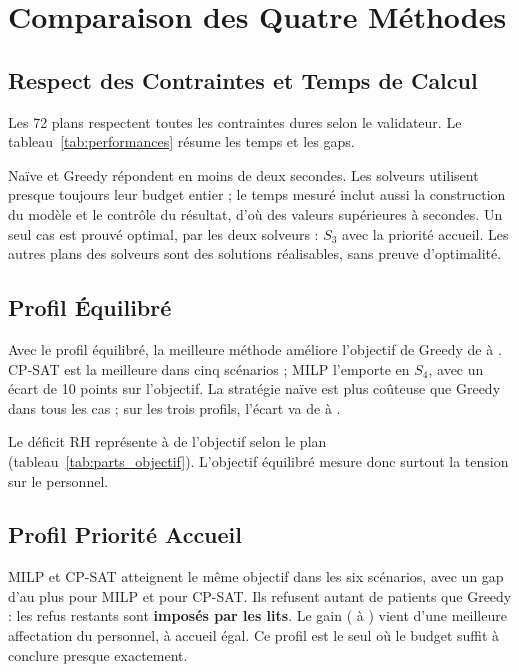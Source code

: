 \section{Comparaison des Quatre Méthodes}

\subsection{Respect des Contraintes et Temps de Calcul}
Les 72 plans respectent toutes les contraintes dures selon le validateur. Le tableau~\ref{tab:performances} résume les temps et les gaps.



Naïve et Greedy répondent en moins de deux secondes. Les solveurs utilisent presque toujours leur budget entier ; le temps mesuré inclut aussi la construction du modèle et le contrôle du résultat, d'où des valeurs supérieures à \TempsSolveur{} secondes. Un seul cas est prouvé optimal, par les deux solveurs : $S_3$ avec la priorité accueil. Les autres plans des solveurs sont des solutions réalisables, sans preuve d'optimalité.

\subsection{Profil Équilibré}


Avec le profil équilibré, la meilleure méthode améliore l'objectif de Greedy de \GainMinEq{} à \GainMaxEq{}. CP-SAT est la meilleure dans cinq scénarios ; MILP l'emporte en $S_4$, avec un écart de 10 points sur l'objectif. La stratégie naïve est plus coûteuse que Greedy dans tous les cas ; sur les trois profils, l'écart va de \NaiveMin{} à \NaiveMax{}.

Le déficit RH représente \PartRhMin{} à \PartRhMax{} de l'objectif selon le plan (tableau~\ref{tab:parts_objectif}). L'objectif équilibré mesure donc surtout la tension sur le personnel.



\subsection{Profil Priorité Accueil}


MILP et CP-SAT atteignent le même objectif dans les six scénarios, avec un gap d'au plus \GapMaxAccueilMilp{} pour MILP et \GapMaxAccueilCp{} pour CP-SAT. Ils refusent autant de patients que Greedy : les refus restants sont \textbf{imposés par les lits}. Le gain (\GainMinAcc{} à \GainMaxAcc{}) vient d'une meilleure affectation du personnel, à accueil égal. Ce profil est le seul où le budget suffit à conclure presque exactement.


